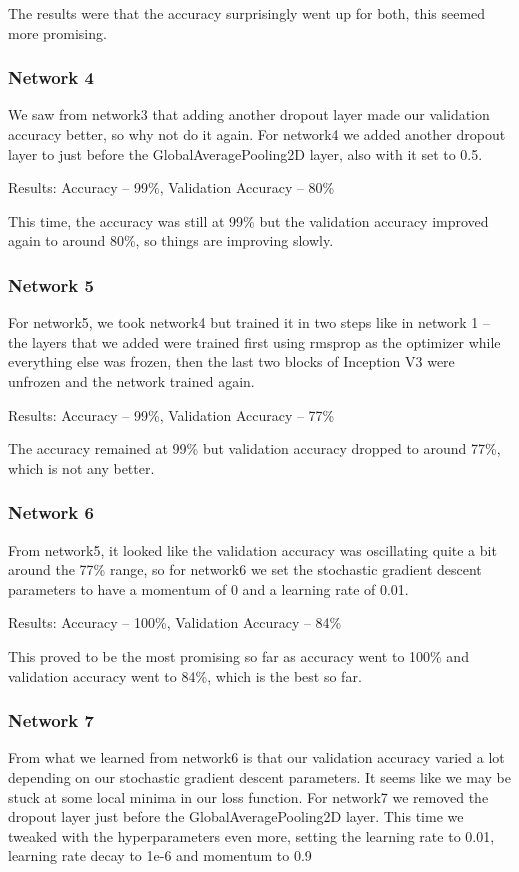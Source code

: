 The results were that the accuracy surprisingly went up for both, this seemed more promising.
\subsubsection{Network 4}

We saw from network3 that adding another dropout layer made our validation accuracy better, so why not do it again. For network4 we added another dropout layer to just before the GlobalAveragePooling2D layer, also with it set to 0.5. 

Results: Accuracy – 99\%, Validation Accuracy – 80\%

This time, the accuracy was still at 99\% but the validation accuracy improved again to around 80\%, so things are improving slowly.
\subsubsection{Network 5}

For network5, we took network4 but trained it in two steps like in network 1 – the layers that we added were trained first using rmsprop as the optimizer while everything else was frozen, then the last two blocks of Inception V3 were unfrozen and the network trained again. 

Results: Accuracy – 99\%, Validation Accuracy – 77\%

The accuracy remained at 99\% but validation accuracy dropped to around 77\%, which is not any better.
\subsubsection{Network 6}

From network5, it looked like the validation accuracy was oscillating quite a bit around the 77\% range, so for network6 we set the stochastic gradient descent parameters to have a momentum of 0 and a learning rate of 0.01.

Results: Accuracy – 100\%, Validation Accuracy – 84\%

This proved to be the most promising so far as accuracy went to 100\% and validation accuracy went to 84\%, which is the best so far.
\subsubsection{Network 7}

From what we learned from network6 is that our validation accuracy varied a lot depending on our stochastic gradient descent parameters. It seems like we may be stuck at some local minima in our loss function. For network7 we removed the dropout layer just before the GlobalAveragePooling2D layer. This time we tweaked with the hyperparameters even more, setting the learning rate to 0.01, learning rate decay to 1e-6 and momentum to 0.9


